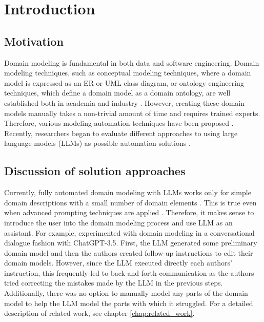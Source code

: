 \chapter*{Introduction}


\section*{Motivation}

Domain modeling is fundamental in both data and software engineering. Domain modeling techniques, such as conceptual modeling techniques, where a domain model is expressed as an ER or UML class diagram, or ontology engineering techniques, which define a domain model as a domain ontology, are well established both in academia and industry \cite{Verdonck2018}. However, creating these domain models manually takes a non-trivial amount of time and requires trained experts. Therefore, various modeling automation techniques have been proposed \cite{Sonbol2022}. Recently, researchers began to evaluate different approaches to using large language models (LLMs) as possible automation solutions \cite{Chen2023,Saeedizade2024}.


\section*{Discussion of solution approaches}

Currently, fully automated domain modeling with LLMs works only for simple domain descriptions with a small number of domain elements \cite{Camara2023}. This is true even when advanced prompting techniques are applied \cite{Chen2023,Saeedizade2024}. Therefore, it makes sense to introduce the user into the domain modeling process \cite{Camara2023} and use LLM as an assistant. For example, \citet{Camara2023} experimented with domain modeling in a conversational dialogue fashion with ChatGPT-3.5. First, the LLM generated some preliminary domain model and then the authors created follow-up instructions to edit their domain models. However, since the LLM executed directly each authors' instruction, this frequently led to back-and-forth communication as the authors tried correcting the mistakes made by the LLM in the previous steps. Additionally, there was no option to manually model any parts of the domain model to help the LLM model the parts with which it struggled. For a detailed description of related work, see chapter \ref{chap:related_work}.


